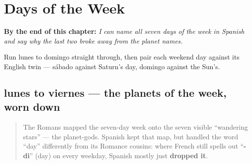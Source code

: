
\chapter{Days of the Week}
\label{ch:spanish-days-of-the-week}

\begin{chapteropening}
\textbf{By the end of this chapter:} \emph{I can name all seven days of the week in Spanish and say why the last two broke away from the planet names.}

Run lunes to domingo straight through, then pair each weekend day against its English twin — sábado against Saturn's day, domingo against the Sun's.
\end{chapteropening}

\section[lunes, martes, miércoles, jueves, viernes]{lunes to viernes — the planets of the week, worn down}

\label{lesson:ES-C21-lunes-viernes}



\begin{quote}
The Romans mapped the seven-day week onto the seven visible \textquotedblleft{}wandering stars\textquotedblright{} — the planet-gods. Spanish kept that map, but handled the word \textquotedblleft{}day\textquotedblright{} differently from its Romance cousins: where French still spells out \textquotedblleft{}\textbf{-di}\textquotedblright{} (day) on every weekday, Spanish mostly just \textbf{dropped it}.
\end{quote}


